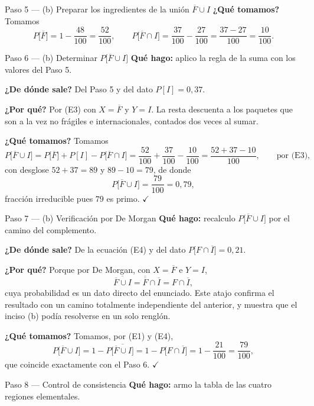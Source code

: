 \documentclass[11pt]{article}
\begin{document}
\begin{sol}
\begin{paso}{Paso 5 --- (b) Preparar los ingredientes de la unión $\overline{F}\cup I$}
\textbf{¿Qué tomamos?} Tomamos
\[
P\big[\overline{F}\big]=1-\frac{48}{100}=\frac{52}{100} ,
\qquad
P\big[\overline{F}\cap I\big]=\frac{37}{100}-\frac{27}{100}=\frac{37-27}{100}=\frac{10}{100} .
\]
\end{paso}

\begin{paso}{Paso 6 --- (b) Determinar $P\big[\overline{F}\cup I\big]$}
\textbf{Qué hago:} aplico la regla de la suma con los valores del Paso 5.

\textbf{¿De dónde sale?} Del Paso 5 y del dato $P[I]=0{,}37$.

\textbf{¿Por qué?} Por (E3) con $X=\overline{F}$ y $Y=I$. La resta descuenta a los paquetes que
son a la vez no frágiles e internacionales, contados dos veces al sumar.

\textbf{¿Qué tomamos?} Tomamos
\[
P\big[\overline{F}\cup I\big]=P\big[\overline{F}\big]+P[I]-P\big[\overline{F}\cap I\big]
=\frac{52}{100}+\frac{37}{100}-\frac{10}{100}=\frac{52+37-10}{100} , \qquad\text{por (E3),}
\]
con desglose $52+37=89$ y $89-10=79$, de donde
\[
P\big[\overline{F}\cup I\big]=\frac{79}{100}=0{,}79 ,
\]
fracción irreducible pues $79$ es primo. $\checkmark$
\end{paso}

\begin{paso}{Paso 7 --- (b) Verificación por De Morgan}
\textbf{Qué hago:} recalculo $P\big[\overline{F}\cup I\big]$ por el camino del complemento.

\textbf{¿De dónde sale?} De la ecuación (E4) y del dato $P\big[F\cap\overline{I}\big]=0{,}21$.

\textbf{¿Por qué?} Porque por De Morgan, con $X=\overline{F}$ e $Y=I$,
\[
\overline{\overline{F}\cup I}=\overline{\overline{F}}\cap\overline{I}=F\cap\overline{I},
\]
cuya probabilidad es un dato directo del enunciado. Este atajo confirma el resultado con un
camino totalmente independiente del anterior, y muestra que el inciso (b) podía resolverse en un
solo renglón.

\textbf{¿Qué tomamos?} Tomamos, por (E1) y (E4),
\[
P\big[\overline{F}\cup I\big]=1-P\big[\overline{\overline{F}\cup I}\big]
=1-P\big[F\cap\overline{I}\big]=1-\frac{21}{100}=\frac{79}{100},
\]
que coincide exactamente con el Paso 6. $\checkmark$
\end{paso}

\begin{paso}{Paso 8 --- Control de consistencia}
\textbf{Qué hago:} armo la tabla de las cuatro regiones elementales.


\end{paso}
\end{sol}
\end{document}
